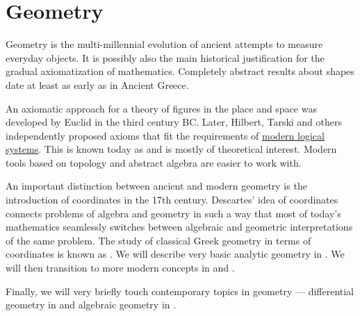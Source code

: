 \section{Geometry}\label{sec:geometry}

Geometry is the multi-millennial evolution of ancient attempts to measure everyday objects. It is possibly also the main historical justification for the gradual axiomatization of mathematics. Completely abstract results about shapes date at least as early as in Ancient Greece.

An axiomatic approach for a theory of figures in the place and space was developed by Euclid in the third century BC. Later, Hilbert, Tarski and others independently proposed axioms that fit the requirements of \hyperref[sec:mathematical_logic]{modern logical systems}. This is known today as  and is mostly of theoretical interest. Modern tools based on topology and abstract algebra are easier to work with.

An important distinction between ancient and modern geometry is the introduction of coordinates in the 17th century. Descartes' idea of coordinates connects problems of algebra and geometry in such a way that most of today's mathematics seamlessly switches between algebraic and geometric interpretations of the same problem. The study of classical Greek geometry in terms of coordinates is known as . We will describe very basic analytic geometry in . We will then transition to more modern concepts in  and .

Finally, we will very briefly touch contemporary topics in geometry --- differential geometry in  and algebraic geometry in .
